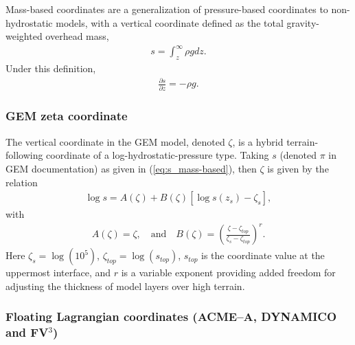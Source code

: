 \documentclass[gmd, manuscript]{copernicus}
\newcommand{\vb}{\mathbf}
\newcommand{\pdiff}[2]{\frac{\partial #1}{\partial #2}}
\begin{document}
Mass-based coordinates \citep{laprise1992euler} are a generalization of pressure-based coordinates to non-hydrostatic models, with a vertical coordinate defined as the total gravity-weighted overhead mass,
\begin{align} \label{eq:s_mass-based}
s = \int^{\infty}_{z} \rho g dz.
\end{align}  Under this definition,
\begin{align}
\pdiff{s}{z} = - \rho g.
\end{align}


\subsubsection{GEM zeta coordinate} \label{sec:GEM_zeta}

The vertical coordinate in the GEM model, denoted $\zeta$, is a hybrid terrain-following coordinate of a log-hydrostatic-pressure type.  Taking $s$ (denoted $\pi$ in GEM documentation) as given in (\ref{eq:s_mass-based}), then $\zeta$ is given by the relation
\begin{align}\label{eq:gem_zeta}
\log s = A(\zeta) + B(\zeta) \left[ \log s(z_s)  - \zeta_s \right],
\end{align}
\noindent with
\begin{align}
A(\zeta) = \zeta, \quad \mbox{and} \quad B(\zeta) =\left( \frac {\zeta-\zeta_{top}} {\zeta_s -\zeta_{top}} \right)^r.
\end{align}
Here  $\zeta_s = \log(10^5)$, $\zeta_{top} = \log(s_{top})$,
$s_{top}$ is the coordinate value at the uppermost interface, and $r$ is a variable exponent providing added freedom for adjusting the thickness of model layers over high terrain.

\subsubsection{Floating Lagrangian coordinates (ACME--A, DYNAMICO and FV$^3$)} \label{sec:FloatingLagrangian}
\end{document}
